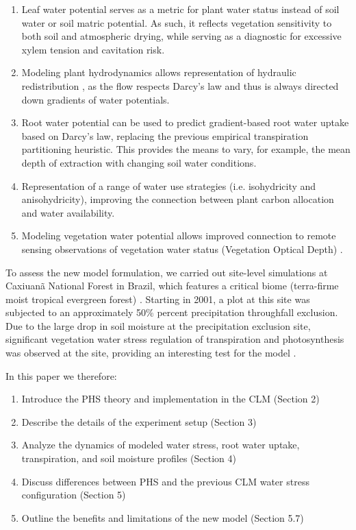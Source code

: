 \documentclass[draft,linenumbers]{agujournal}
\begin{document}
\begin{enumerate}
\item Leaf water potential serves as a metric for plant water status instead of soil water or soil matric potential. As such, it reflects vegetation sensitivity to both soil and atmospheric drying, while serving as a diagnostic for excessive xylem tension and cavitation risk. 
\item Modeling plant hydrodynamics allows representation of hydraulic redistribution \citep{lee2005}, as the flow respects Darcy's law and thus is always directed down gradients of water potentials. 
\item Root water potential can be used to predict gradient-based root water uptake based on Darcy's law, replacing the previous empirical transpiration partitioning heuristic. This provides the means to vary, for example, the mean depth of extraction with changing soil water conditions.
\item Representation of a range of water use strategies (i.e. isohydricity and anisohydricity), improving the connection between plant carbon allocation and water availability.
\item Modeling vegetation water potential allows improved connection to remote sensing observations of vegetation water status (Vegetation Optical Depth) \citep{konings2016}. 
\end{enumerate}

To assess the new model formulation, we carried out site-level simulations at Caxiuan\~a National Forest in Brazil, which features a critical biome (terra-firme moist tropical evergreen forest) \citep{fisher2006}. Starting in 2001, a plot at this site was subjected to an approximately 50\% percent precipitation throughfall exclusion. Due to the large drop in soil moisture at the precipitation exclusion site, significant vegetation water stress regulation of transpiration and photosynthesis was observed at the site, providing an interesting test for the model \citep{fisher2007}.

In this paper we therefore:
\begin{enumerate}
\item Introduce the PHS theory and implementation in the CLM (Section 2)
\item Describe the details of the experiment setup (Section 3)
\item Analyze the dynamics of modeled water stress, root water uptake, transpiration, and soil moisture profiles (Section 4)
\item Discuss differences between PHS and the previous CLM water stress configuration (Section 5)
\item Outline the benefits and limitations of the new model (Section 5.7)
\end{enumerate}
\end{document}
